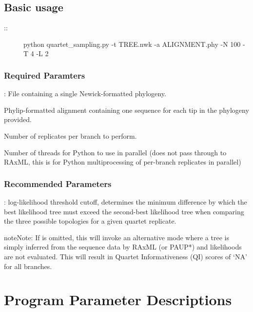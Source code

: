 \documentclass[letterpaper,12pt,english]{sphinxmanual}
\begin{document}
\section{Basic usage}
\label{\detokenize{intro:basic-usage}}\begin{description}
\item[{::}] \leavevmode
python quartet\_sampling.py -t TREE.nwk -a ALIGNMENT.phy -N 100 -T 4 -L 2

\end{description}


\subsection{Required Paramters}
\label{\detokenize{intro:required-paramters}}
: File containing a single Newick-formatted phylogeny.

 Phylip-formatted alignment containing one sequence for each tip in the phylogeny provided.

 Number of replicates per branch to perform.

 Number of threads for Python to use in parallel (does not pass through to RAxML, this is for Python multiprocessing of per-branch replicates in parallel)


\subsection{Recommended Parameters}
\label{\detokenize{intro:recommended-parameters}}
: log-likelihood threshold cutoff, determines the minimum difference by which the best likelihood tree must exceed the second-best likelihood tree when comparing the three possible topologies for a given quartet replicate.

\begin{sphinxadmonition}{note}{Note:}
If  is omitted, this will invoke an alternative mode where a tree is simply inferred from the sequence data by RAxML (or PAUP*) and likelihoods are not evaluated.  This will result in Quartet Informativeness (QI) scores of ‘NA’ for all branches.
\end{sphinxadmonition}


\chapter{Program Parameter Descriptions}
\label{\detokenize{prog_desc:program-parameter-descriptions}}\label{\detokenize{prog_desc::doc}}
\end{document}
